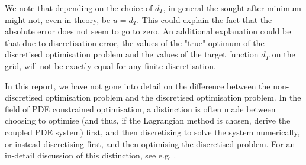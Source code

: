 We note that depending on the choice of $d_T$, in general the sought-after minimum might not, even in theory, be $u=d_T$. This could explain the fact that the absolute error does not seem to go to zero. An additional explanation could be that due to discretisation error, the values of the "true" optimum of the discretised optimisation problem and the values of the target function $d_T$ on the grid, will not be exactly equal for any finite discretisation. 

In this report, we have not gone into detail on the difference between the non-discretised optimisation problem and the discretised optimisation problem. In the field of PDE constrained optimisation, a distinction is often made between choosing to optimise (and thus, if the Lagrangian method is chosen, derive the coupled PDE system) first, and then discretising to solve the system numerically, or instead discretising first, and then optimising the discretised problem. For an in-detail discussion of this distinction, see e.g. \cite{rees_preconditioning_2010}. 
